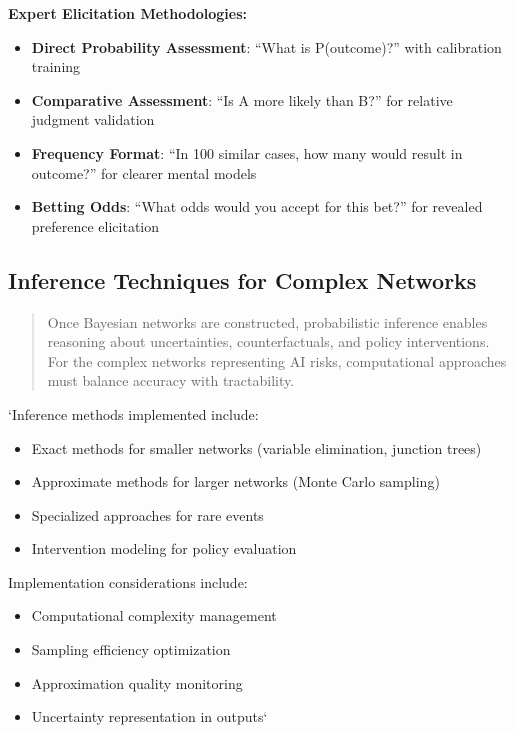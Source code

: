 \documentclass[
  11pt,
  letterpaper,
]{book}
\providecommand{\tightlist}{%
  \setlength{\itemsep}{0pt}\setlength{\parskip}{0pt}}
\begin{document}
\textbf{Expert Elicitation Methodologies:}

\begin{itemize}
\tightlist
\item
  \textbf{Direct Probability Assessment}: ``What is P(outcome)?'' with
  calibration training
\item
  \textbf{Comparative Assessment}: ``Is A more likely than B?'' for
  relative judgment validation
\item
  \textbf{Frequency Format}: ``In 100 similar cases, how many would
  result in outcome?'' for clearer mental models
\item
  \textbf{Betting Odds}: ``What odds would you accept for this bet?''
  for revealed preference elicitation
\end{itemize}

\subsection{Inference Techniques for Complex
Networks}\label{sec-inference-techniques}

\begin{quote}
Once Bayesian networks are constructed, probabilistic inference enables
reasoning about uncertainties, counterfactuals, and policy
interventions. For the complex networks representing AI risks,
computational approaches must balance accuracy with tractability.
\end{quote}

`Inference methods implemented include:

\begin{itemize}
\tightlist
\item
  Exact methods for smaller networks (variable elimination, junction
  trees)
\item
  Approximate methods for larger networks (Monte Carlo sampling)
\item
  Specialized approaches for rare events
\item
  Intervention modeling for policy evaluation
\end{itemize}

Implementation considerations include:

\begin{itemize}
\tightlist
\item
  Computational complexity management
\item
  Sampling efficiency optimization
\item
  Approximation quality monitoring
\item
  Uncertainty representation in outputs`
\end{itemize}
\end{document}
